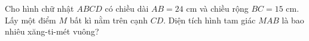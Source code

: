 \begin{ex} %
Cho hình chữ nhật $ABCD$ có chiều dài $AB = 24\text{ cm}$ và chiều rộng $BC = 15\text{ cm}$. Lấy một điểm $M$ bất kì nằm trên cạnh $CD$. Diện tích hình tam giác $MAB$ là bao nhiêu xăng-ti-mét vuông?
\end{ex}
